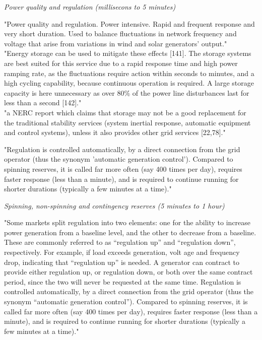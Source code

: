 \emph{Power quality and regulation (millisecons to 5 minutes)}

"Power quality and regulation. Power intensive. Rapid and frequent response and very short duration. Used to balance fluctuations in network frequency and voltage that arise from variations in wind and solar generators' output." \\
"Energy storage can be used to mitigate these effects [141]. The storage systems are best suited for this service due to a rapid response time and high power ramping rate, as the fluctuations require action within seconds to minutes, and a high cycling capability, because continuous operation is required. A large storage capacity is here unnecessary as over 80\% of the power line disturbances last for less than a second [142]." \\
"a NERC report which claims that storage may not be a good replacement for the traditional stability services (system inertial response, automatic equipment and control systems), unless it also provides other grid services [22,78]." \cite{lund_review_2015} 

"Regulation is controlled automatically, by a direct connection from the grid operator (thus the synonym 'automatic generation control'). Compared to spinning reserves, it is called far more often (say 400 times per day), requires faster response (less than a minute), and is required to continue running for shorter durations (typically a few minutes at a time)." \cite{kempton_vehicle--grid_2005}


\emph{Spinning, non-spinning and contingency reserves (5 minutes to 1 hour)}

"Some markets split regulation into two elements: one for the ability to increase power generation from a baseline level, and the other to decrease from a baseline. These are commonly referred to as “regulation up” and “regulation down”, respectively. For example, if load exceeds generation, volt age and frequency drop, indicating that “regulation up” is needed. A generator can contract to provide either regulation up, or regulation down, or both over the same contract period, since the two will never be requested at the same time. Regulation is controlled automatically, by a direct connection from the grid operator (thus the synonym “automatic generation control”). Compared to spinning reserves, it is called far more often (say 400 times per day), requires faster response (less than a minute), and is required to continue running for shorter durations (typically a few minutes at a time)." \cite{kempton_vehicle--grid_2005}

